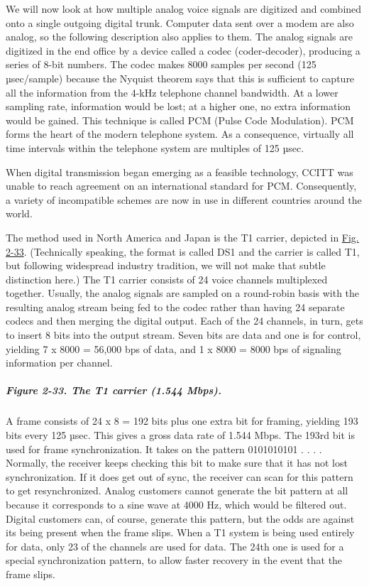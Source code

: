 We will now look at how multiple analog voice signals are digitized and
combined onto a single outgoing digital trunk. Computer data sent over a
modem are also analog, so the following description also applies to
them. The analog signals are digitized in the end office by a device
called a {codec} (coder-decoder), producing a series of 8-bit numbers.
The codec makes 8000 samples per second (125 µsec/sample) because the
Nyquist theorem says that this is sufficient to capture all the
information from the 4-kHz telephone channel bandwidth. At a lower
sampling rate, information would be lost; at a higher one, no extra
information would be gained. This technique is called {PCM} ({Pulse Code
Modulation}). PCM forms the heart of the modern telephone system. As a
consequence, virtually all time intervals within the telephone system
are multiples of 125 µsec.

When digital transmission began emerging as a feasible technology, CCITT
was unable to reach agreement on an international standard for PCM.
Consequently, a variety of incompatible schemes are now in use in
different countries around the world.

The method used in North America and Japan is the {T1} carrier, depicted
in
\protect\hyperlink{0130661023_ch02lev1sec5.htmlux5cux23ch02fig33}{Fig.
2-33}. (Technically speaking, the format is called DS1 and the carrier
is called T1, but following widespread industry tradition, we will not
make that subtle distinction here.) The T1 carrier consists of 24 voice
channels multiplexed together. Usually, the analog signals are sampled
on a round-robin basis with the resulting analog stream being fed to the
codec rather than having 24 separate codecs and then merging the digital
output. Each of the 24 channels, in turn, gets to insert 8 bits into the
output stream. Seven bits are data and one is for control, yielding 7 x
8000 = 56,000 bps of data, and 1 x 8000 = 8000 bps of signaling
information per channel.

\subparagraph[Figure 2-33. The T1 carrier (1.544
Mbps).]{\texorpdfstring{\protect\hypertarget{0130661023_ch02lev1sec5.htmlux5cux23ch02fig33}{}{}Figure
2-33. The T1 carrier (1.544
Mbps).}{Figure 2-33. The T1 carrier (1.544 Mbps).}}


A frame consists of 24 x 8 = 192 bits plus one extra bit for framing,
yielding 193 bits every 125 µsec{.} This gives a gross data rate of
1.544 Mbps. The 193rd bit is used for frame synchronization. It takes on
the pattern 0101010101 . . . . Normally, the receiver keeps checking
this bit to make sure that it has not lost synchronization. If it does
get out of sync, the receiver can scan for this pattern to get
resynchronized. Analog customers cannot generate the bit pattern at all
because it corresponds to a sine wave at 4000 Hz, which would be
filtered out. Digital customers can, of course, generate this pattern,
but the odds are against its being present when the frame slips. When a
T1 system is being used entirely for data, only 23 of the channels are
used for data. The 24th one is used for a special synchronization
pattern, to allow faster recovery in the event that the frame slips.

